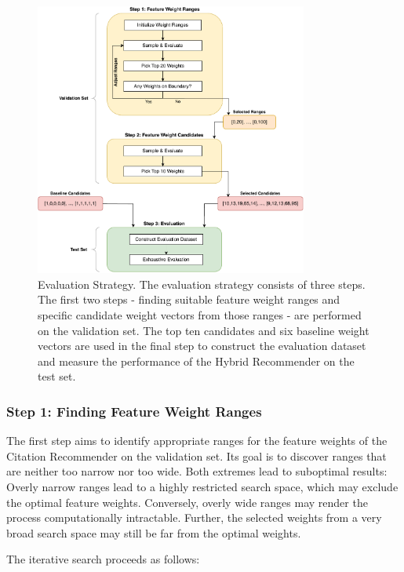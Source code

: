 \begin{figure}[htb!]
    \centering
    \includegraphics[width=0.8\textwidth]{diagrams/evaluation_strategy.pdf}
    \caption[Evaluation Strategy]{Evaluation Strategy. The evaluation strategy consists of three steps. The first two steps - finding suitable feature weight ranges and specific candidate weight vectors from those ranges - are performed on the validation set.
        The top ten candidates and six baseline weight vectors are used in the final step to construct the evaluation dataset and measure the performance of the Hybrid Recommender on the test set.}
    \label{fig:evaluation-strategy}
\end{figure}


\subsubsection*{Step 1: Finding Feature Weight Ranges}

The first step aims to identify appropriate ranges for the feature weights of the Citation Recommender on the validation set.
Its goal is to discover ranges that are neither too narrow nor too wide. Both extremes lead to suboptimal results:
Overly narrow ranges lead to a highly restricted search space, which may exclude the optimal feature weights.
Conversely, overly wide ranges may render the process computationally intractable. Further, the selected weights from a very broad search space may still be far from the optimal weights.

The iterative search proceeds as follows:

